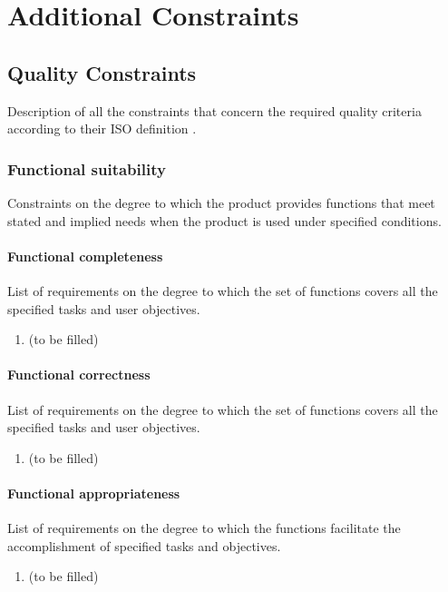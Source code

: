\chapter{Additional Constraints}
\label{chap:additional-constraints}

\section{Quality Constraints}

Description of all the constraints that concern the required quality criteria according to their ISO definition \cite{iso-square-25010-2011}.

\subsection{Functional suitability}
Constraints on the degree to which the product provides functions that meet stated and implied needs when the product is used under specified conditions.
\subsubsection{Functional completeness}
List of requirements on the degree to which the set of functions covers all the specified tasks and user objectives.
\begin{enumerate}
\item (to be filled)
\end{enumerate}
\subsubsection{Functional correctness}
List of requirements on the degree to which the set of functions covers all the specified tasks and user objectives.
\begin{enumerate}
\item (to be filled)
\end{enumerate}
\subsubsection{Functional appropriateness}
List of requirements on the degree to which the functions facilitate the accomplishment of specified tasks and objectives.
\begin{enumerate}
\item (to be filled)
\end{enumerate}

